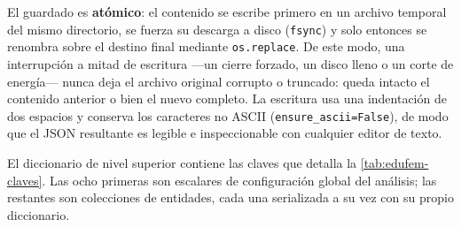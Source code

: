 El guardado es \textbf{atómico}: el contenido se escribe primero en un archivo temporal del mismo directorio, se fuerza su descarga a disco (\texttt{fsync}) y solo entonces se renombra sobre el destino final mediante \texttt{os.replace}. De este modo, una interrupción a mitad de escritura ---un cierre forzado, un disco lleno o un corte de energía--- nunca deja el archivo original corrupto o truncado: queda intacto el contenido anterior o bien el nuevo completo. La escritura usa una indentación de dos espacios y conserva los caracteres no ASCII (\texttt{ensure\_ascii=False}), de modo que el JSON resultante es legible e inspeccionable con cualquier editor de texto.

El diccionario de nivel superior contiene las claves que detalla la \autoref{tab:edufem-claves}. Las ocho primeras son escalares de configuración global del análisis; las restantes son colecciones de entidades, cada una serializada a su vez con su propio diccionario.

